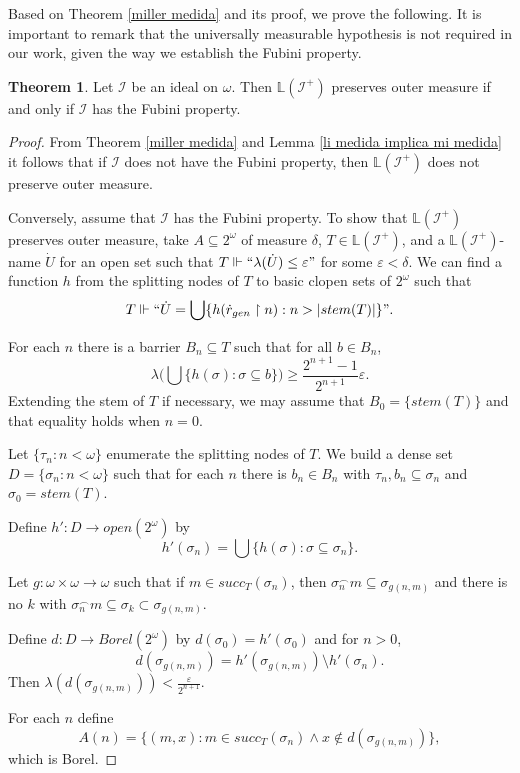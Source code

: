 \documentclass{amsart}
\theoremstyle{definition}
\newtheorem{theorem}{Theorem}[section]
\theoremstyle{remark}
\numberwithin{equation}{section}
\newcommand{\li}{\mathbb{L}(\mathcal{I}^+)}
\newcommand{\id}{\mathcal{I}}
\newcommand{\restr}[2]{#1\upharpoonright {#2}}
\begin{document}
Based on Theorem \ref{miller medida} and its proof, we prove the following. It is important to remark that the universally measurable hypothesis is not required in our work, given the way we establish the Fubini property.

\begin{theorem}
Let $\id$ be an ideal on $\omega$. Then $\li$ preserves outer measure if and only if $\id$ has the Fubini property.
\end{theorem}

\begin{proof}
From Theorem \ref{miller medida} and Lemma \ref{li medida implica mi medida} it follows that if $\id$ does not have the Fubini property, then $\li$ does not preserve outer measure.

Conversely, assume that $\id$ has the Fubini property. To show that $\li$ preserves outer measure, take $A\subseteq 2^\omega$ of measure $\delta$, $T\in\li$, and a $\li$-name $\dot U$ for an open set such that $T\Vdash``\lambda(\dot U)\leq\varepsilon"$ for some $\varepsilon<\delta$. We can find a function $h$ from the splitting nodes of $T$ to basic clopen sets of $2^\omega$ such that
\[
T\Vdash`` \dot U=\bigcup \{h(\restr{\dot r_{gen}}{n}): n>|stem(T)|\}".
\]

For each $n$ there is a barrier $B_n\subseteq T$ such that for all $b\in B_n$,
\[
\lambda\Big(\bigcup\{h(\sigma): \sigma\subseteq b\}\Big) \geq \frac{2^{n+1}-1}{2^{n+1}}\varepsilon.
\]
Extending the stem of $T$ if necessary, we may assume that $B_0=\{stem(T)\}$ and that equality holds when $n=0$.

Let $\{\tau_n:n<\omega\}$ enumerate the splitting nodes of $T$. We build a dense set $D=\{\sigma_n:n<\omega\}$ such that for each $n$ there is $b_n\in B_n$ with $\tau_n,b_n\subseteq \sigma_n$ and $\sigma_0=stem(T)$.

Define $h':D\to open(2^\omega)$ by
\[
h'(\sigma_n)=\bigcup\{h(\sigma):\sigma\subseteq \sigma_n\}.
\]

Let $g:\omega\times \omega\to \omega$ such that if $m\in succ_T(\sigma_n)$, then $\sigma_n^\frown m\subseteq \sigma_{g(n,m)}$ and there is no $k$ with $\sigma_n^\frown m\subseteq \sigma_k \subset \sigma_{g(n,m)}$.

Define $d:D\to Borel(2^\omega)$ by $d(\sigma_0)=h'(\sigma_0)$ and for $n>0$,
\[
d(\sigma_{g(n,m)}) = h'(\sigma_{g(n,m)})\setminus h'(\sigma_n).
\]
Then $\lambda(d(\sigma_{g(n,m)}))<\frac{\varepsilon}{2^{n+1}}$.

For each $n$ define
\[
A(n)=\{(m,x): m\in succ_T(\sigma_n) \wedge x\notin d(\sigma_{g(n,m)})\},
\]
which is Borel.


\end{proof}
\end{document}
